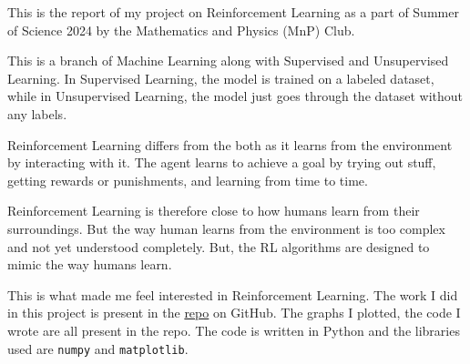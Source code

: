 This is the report of my project on Reinforcement Learning as a part of Summer of Science 2024 by the Mathematics and Physics (MnP) Club.

This is a branch of Machine Learning along with Supervised and Unsupervised Learning. In Supervised Learning, the model is trained on a labeled dataset, while in Unsupervised Learning, the model just goes through the dataset without any labels.

Reinforcement Learning differs from the both as it learns from the environment by interacting with it. The agent learns to achieve a goal by trying out stuff, getting rewards or punishments, and learning from time to time.

Reinforcement Learning is therefore close to how humans learn from their surroundings. But the way human learns from the environment is too complex and not yet understood completely. But, the RL algorithms are designed to mimic the way humans learn.

This is what made me feel interested in Reinforcement Learning. The work I did in this project is present in the \href{https://github.com/balaji1029/reinforcement-learning-sos/}{repo} on GitHub. The graphs I plotted, the code I wrote are all present in the repo. The code is written in Python and the libraries used are \texttt{numpy} and \texttt{matplotlib}.